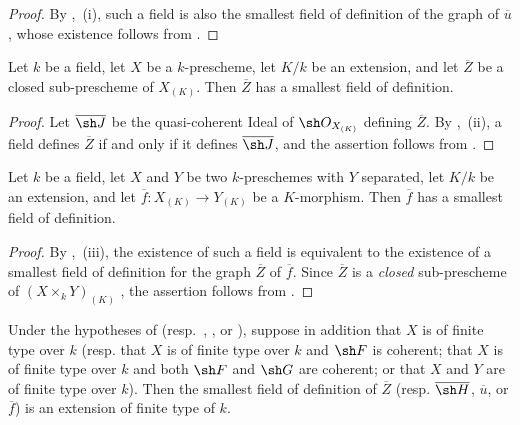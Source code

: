 \begin{proof}
By ,~(i), such a field is also the smallest field of
definition of the graph of $\overline u$, whose existence follows
from .
\end{proof}


\begin{corollary}[4.8.11]
\label{IV.4.8.11}
Let $k$ be a field, let $X$ be a $k$-prescheme, let $K/k$ be an
extension, and let $\overline Z$ be a closed sub-prescheme of
$X_{(K)}$.
Then $\overline Z$ has a smallest field of definition.
\end{corollary}

\begin{proof}
Let $\overline{\sh J}$ be the quasi-coherent Ideal of
$\sh O_{X_{(K)}}$ defining $\overline Z$.
By ,~(ii), a field defines $\overline Z$ if and only if
it defines $\overline{\sh J}$, and the assertion follows from
.
\end{proof}

\begin{corollary}[4.8.12]
\label{IV.4.8.12}
Let $k$ be a field, let $X$ and $Y$ be two $k$-preschemes with $Y$
separated, let $K/k$ be an extension, and let
$\overline f:X_{(K)}\to Y_{(K)}$ be a $K$-morphism.
Then $\overline f$ has a smallest field of definition.
\end{corollary}

\begin{proof}
By ,~(iii), the existence of such a field is equivalent
to the existence of a smallest field of definition for the graph
$\overline Z$ of $\overline f$.
Since $\overline Z$ is a \emph{closed} sub-prescheme of
$(X\times_kY)_{(K)}$ , the assertion follows from
.
\end{proof}

\begin{proposition}[4.8.13]
\label{IV.4.8.13}
Under the hypotheses of 
(resp.\ , , or
), suppose in addition that $X$ is of finite type
over $k$
\textup{(resp.} that $X$ is of finite type over $k$ and $\sh F$ is coherent;
that $X$ is of finite type over $k$ and both $\sh F$ and $\sh G$ are
coherent; or that $X$ and $Y$ are of finite type over $k$\textup{)}.
Then the smallest field of definition of $\overline Z$
\textup{(resp.} $\overline{\sh H}$, $\overline u$, or $\overline f$\textup{)} is an extension of
finite type of $k$.
\end{proposition}

